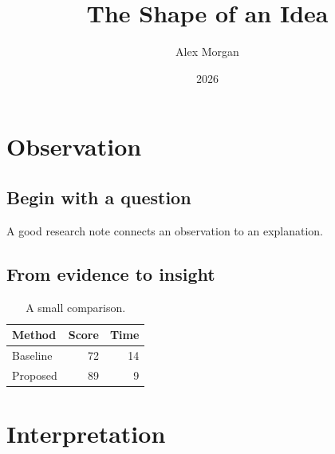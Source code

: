 \documentclass{tufte-book}
\title{The Shape of an Idea}\author{Alex Morgan}\date{2026}
\begin{document}
\maketitle
\tableofcontents\chapter{Observation}
\section{Begin with a question}
A good research note connects an observation to an explanation.
\lipsum[1-2]
\begin{marginfigure}\centering
\fbox{\rule{0pt}{25mm}\rule{0.8\linewidth}{0pt}}
\caption{Replace this placeholder with a figure.}\end{marginfigure}
\section{From evidence to insight}\lipsum[3-4]
\begin{table}[h]\centering\begin{tabular}{lrr}\toprule Method & Score & Time\\\midrule Baseline & 72 & 14\\Proposed & 89 & 9\\\bottomrule\end{tabular}\caption{A small comparison.}\end{table}
\chapter{Interpretation}\lipsum[5-7]
\end{document}

